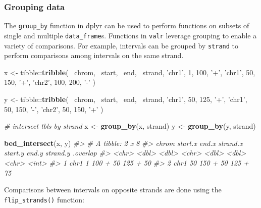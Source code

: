 \documentclass[9pt,a4paper]{extarticle}
\renewcommand{\KeywordTok}[1]{\textbf{{#1}}}
\renewcommand{\DecValTok}[1]{\textcolor[rgb]{0.00,0.00,1.00}{{#1}}}
\renewcommand{\StringTok}[1]{\textcolor[rgb]{0.87,0.00,0.00}{{#1}}}
\renewcommand{\CommentTok}[1]{\textcolor[rgb]{0.50,0.50,0.50}{\textit{{#1}}}}
\renewcommand{\NormalTok}[1]{{#1}}
\begin{document}
\subsubsection{Grouping data}\label{grouping-data}

The \texttt{group\_by} function in dplyr can be used to perform functions
on subsets of single and multiple \texttt{data\_frame}s. Functions in
\texttt{valr} leverage grouping to enable a variety of comparisons. For
example, intervals can be grouped by \texttt{strand} to perform
comparisons among intervals on the same strand.

\begin{Highlighting}[]
\NormalTok{x <-}\StringTok{ }\NormalTok{tibble::}\KeywordTok{tribble}\NormalTok{(}
  \NormalTok{~chrom, ~start, ~end, ~strand,}
  \StringTok{'chr1'}\NormalTok{, }\DecValTok{1}\NormalTok{,      }\DecValTok{100}\NormalTok{,  }\StringTok{'+'}\NormalTok{,}
  \StringTok{'chr1'}\NormalTok{, }\DecValTok{50}\NormalTok{,     }\DecValTok{150}\NormalTok{,  }\StringTok{'+'}\NormalTok{,}
  \StringTok{'chr2'}\NormalTok{, }\DecValTok{100}\NormalTok{,    }\DecValTok{200}\NormalTok{,  }\StringTok{'-'}
\NormalTok{)}

\NormalTok{y <-}\StringTok{ }\NormalTok{tibble::}\KeywordTok{tribble}\NormalTok{(}
  \NormalTok{~chrom, ~start, ~end, ~strand,}
  \StringTok{'chr1'}\NormalTok{, }\DecValTok{50}\NormalTok{,     }\DecValTok{125}\NormalTok{,  }\StringTok{'+'}\NormalTok{,}
  \StringTok{'chr1'}\NormalTok{, }\DecValTok{50}\NormalTok{,     }\DecValTok{150}\NormalTok{,  }\StringTok{'-'}\NormalTok{,}
  \StringTok{'chr2'}\NormalTok{, }\DecValTok{50}\NormalTok{,     }\DecValTok{150}\NormalTok{,  }\StringTok{'+'}
\NormalTok{)}

\CommentTok{# intersect tbls by strand}
\NormalTok{x <-}\StringTok{ }\KeywordTok{group_by}\NormalTok{(x, strand)}
\NormalTok{y <-}\StringTok{ }\KeywordTok{group_by}\NormalTok{(y, strand)}

\KeywordTok{bed_intersect}\NormalTok{(x, y)}
\CommentTok{#> # A tibble: 2 x 8}
\CommentTok{#>   chrom start.x end.x strand.x start.y end.y strand.y .overlap}
\CommentTok{#>   <chr>   <dbl> <dbl>    <chr>   <dbl> <dbl>    <chr>    <int>}
\CommentTok{#> 1  chr1       1   100        +      50   125        +       50}
\CommentTok{#> 2  chr1      50   150        +      50   125        +       75}
\end{Highlighting}

Comparisons between intervals on opposite strands are done using the
\texttt{flip\_strands()} function:
\end{document}

